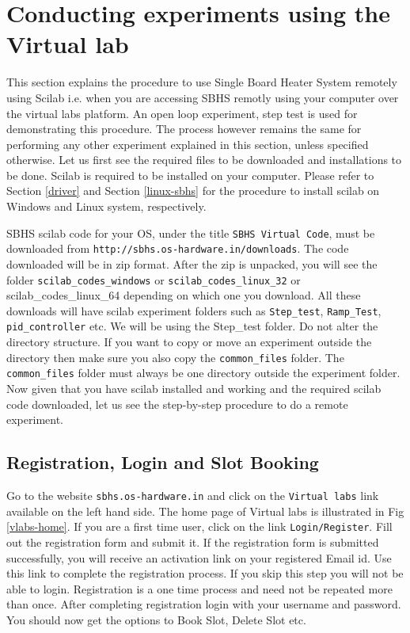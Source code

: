 \section{Conducting experiments using the Virtual lab}\label{vlabsexpt}

This section explains the procedure to use Single Board Heater System remotely using Scilab i.e. when you are accessing SBHS remotly using your computer over the virtual labs platform. An open loop experiment, step test is used for demonstrating this procedure. The process however remains the same for performing any other experiment explained in this section, unless specified otherwise. Let us first see the required files to be downloaded and installations to be done. Scilab is required to be installed on your computer. Please refer to Section \ref{driver} and Section \ref{linux-sbhs} for the procedure to install scilab on Windows and Linux system, respectively.

SBHS scilab code for your OS,  under the title {\tt SBHS Virtual Code}, must be downloaded from {\tt http://sbhs.os-hardware.in/downloads}. The code downloaded will be in zip format. After the zip is unpacked, you will see the folder {\tt scilab\_codes\_windows} or {\tt scilab\_codes\_linux\_32} or {scilab\_codes\_linux\_64} depending on which one you download. All these downloads will have scilab experiment folders such as {\tt Step\_test}, {\tt Ramp\_Test}, {\tt pid\_controller} etc. We will be using the {Step\_test} folder. Do not alter the directory structure. If you want to copy or move an experiment outside the directory then make sure you also copy the {\tt common\_files} folder. The {\tt common\_files} folder must always be one directory outside the experiment folder. Now given that you have scilab installed and working and the required scilab code downloaded, let us see the step-by-step procedure to do a remote experiment.

\subsection{Registration, Login and Slot Booking}
 Go to the website {\tt sbhs.os-hardware.in} and click on the {\tt Virtual labs} link available on the left hand side. The home page of Virtual labs is illustrated in Fig \ref{vlabs-home}. If you are a first time user, click on the link {\tt Login/Register}. Fill out the registration form and submit it. If the registration form is submitted successfully, you will receive an activation link on your registered Email id. Use this link to complete the registration process. If you skip this step you will not be able to login. Registration is a one time process and need not be repeated more than once. After completing registration login with your username and password. You should now get the options to Book Slot, Delete Slot etc. 

